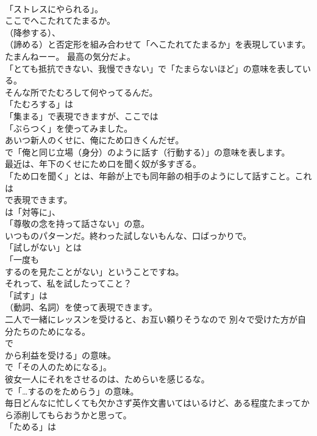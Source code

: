 \documentclass[8pt]{extreport}
\begin{document}
\begin{CJK}{UTF8}{min}
\\	「ストレスにやられる」。	
\\	ここでへこたれてたまるか。 
\\	（降参する）、
\\	（諦める）と否定形を組み合わせて「へこたれてたまるか」を表現しています。	
\\	たまんねーー。 最高の気分だよ。 
\\	「とても抵抗できない、我慢できない」で「たまらないほど」の意味を表している。	
\\	そんな所でたむろして何やってるんだ。 
\\	「たむろする」は
\\	「集まる」で表現できますが、ここでは
\\	「ぶらつく」を使ってみました。	
\\	あいつ新人のくせに、俺にため口きくんだぜ。 
\\	で「俺と同じ立場（身分）のように話す（行動する）」の意味を表します。	
\\	最近は、年下のくせにため口を聞く奴が多すぎる。 
\\	「ため口を聞く」とは、年齢が上でも同年齢の相手のようにして話すこと。これは
\\	で表現できます。
\\	は「対等に」、
\\	「尊敬の念を持って話さない」の意。	
\\	いつものパターンだ。終わった試しないもんな、口ばっかりで。 
\\	「試しがない」とは
\\	「一度も 
\\	するのを見たことがない」ということですね。	
\\	それって、私を試したってこと？ 
\\	「試す」は
\\	（動詞、名詞）を使って表現できます。	
\\	二人で一緒にレッスンを受けると、お互い頼りそうなので 別々で受けた方が自分たちのためになる。 
\\	で
\\	から利益を受ける」の意味。
\\	で「その人のためになる」。	
\\	彼女一人にそれをさせるのは、ためらいを感じるな。 
\\	で「…するのをためらう」の意味。	
\\	毎日どんなに忙しくても欠かさず英作文書いてはいるけど、ある程度たまってから添削してもらおうかと思って。 
\\	「ためる」は 

\end{CJK}
\end{document}
